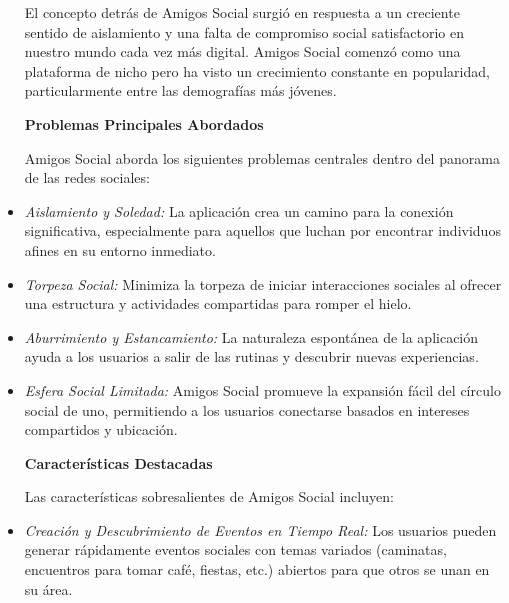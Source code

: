 \begin{itemize}
El concepto detrás de Amigos Social surgió en respuesta a un creciente sentido de aislamiento y una falta de compromiso social 
satisfactorio en nuestro mundo cada vez más digital. Amigos Social comenzó como una plataforma de nicho pero ha visto un crecimiento constante en popularidad, particularmente entre las demografías más jóvenes.


\textbf{Problemas Principales Abordados}

Amigos Social aborda los siguientes problemas centrales dentro del panorama de las redes sociales:

\item \textit{Aislamiento y Soledad:} La aplicación crea un camino para la conexión significativa, especialmente para aquellos que luchan por encontrar individuos afines en su entorno inmediato.
\item \textit{Torpeza Social:} Minimiza la torpeza de iniciar interacciones sociales al ofrecer una estructura y actividades compartidas para romper el hielo.
\item \textit{Aburrimiento y Estancamiento:} La naturaleza espontánea de la aplicación ayuda a los usuarios a salir de las rutinas y descubrir nuevas experiencias.
\item \textit{Esfera Social Limitada:} Amigos Social promueve la expansión fácil del círculo social de uno, permitiendo a los usuarios conectarse basados en intereses compartidos y ubicación.

\textbf{Características Destacadas}

Las características sobresalientes de Amigos Social incluyen:

\item \textit{Creación y Descubrimiento de Eventos en Tiempo Real:} Los usuarios pueden generar rápidamente eventos sociales con temas variados (caminatas, encuentros para tomar café, fiestas, etc.) abiertos para que otros se unan en su área. 


\end{itemize}
